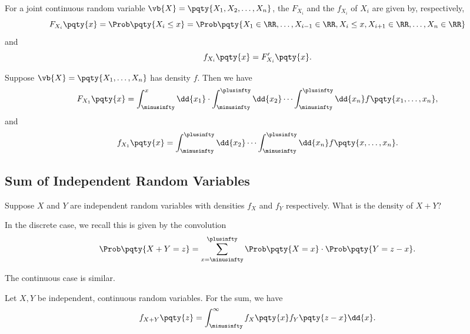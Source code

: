 \begin{definition}
    \label{def:marginal-distribution-density}%
    For a joint continuous random variable \(\vb{X} = \pqty{X_1, X_2, \ldots, X_n}\), the  \(F_{X_i}\) and the  \(f_{X_i}\) of \(X_i\) are given by, respectively,
    \[
        F_{X_i} \pqty{x} = \Prob\pqty{X_i \leq x} = \Prob\pqty{X_1 \in \RR, \ldots, X_{i - 1} \in \RR, X_i \leq x, X_{i + 1} \in \RR, \ldots, X_n \in \RR}
    \]
    and
    \[
        f_{X_i} \pqty{x} = F_{X_i}'\pqty{x}.
    \]
\end{definition}

\begin{proposition}
    \label{prop:marginal-distribution-density-formula}%
    Suppose \(\vb{X} = \pqty{X_1, \ldots, X_n}\) has density \(f\). Then we have
    \[
        F_{X_1} \pqty{x} = \int_{\minusinfty}^{x} \dd{x_1} \cdot \int_{\minusinfty}^{\plusinfty} \dd{x_2} \cdots \int_{\minusinfty}^{\plusinfty} \dd{x_n} f\pqty{x_1, \ldots, x_n},
    \]
    and
    \[
        f_{X_1} \pqty{x} = \int_{\minusinfty}^{\plusinfty} \dd{x_2} \cdots \int_{\minusinfty}^{\plusinfty} \dd{x_n} f\pqty{x, \ldots, x_n}.
    \]
\end{proposition}

\subsection{Sum of Independent Random Variables}

Suppose \(X\) and \(Y\) are independent random variables with densities \(f_X\) and \(f_Y\) respectively. What is the density of \(X + Y\)?

In the discrete case, we recall this is given by the convolution
\[
    \Prob\pqty{X + Y = z} = \sum_{x = \minusinfty}^{\plusinfty} \Prob\pqty{X = x} \cdot \Prob\pqty{Y = z - x}.
\]

The continuous case is similar.

\begin{proposition}
    \label{prop:dist-sum-indp-crv}%
    Let \(X, Y\) be independent, continuous random variables. For the sum, we have
    \[
        f_{X + Y}\pqty{z} = \int_{\minusinfty}^{\infty} f_X\pqty{x} f_Y\pqty{z - x} \dd{x}.
    \]
\end{proposition}

